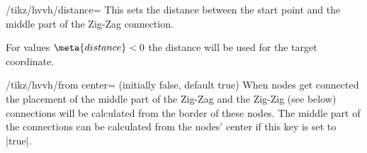 \begin{key}{/tikz/hvvh/distance=}
  This sets the distance between the start point
  and the middle part of the Zig-Zag connection.
  
  For values $\meta{distance} < 0$ the distance will be used for the target coordinate.
\begin{codeexample}[width=8cm,preamble=\usetikzlibrary{paths.ortho}]
\end{codeexample}
\end{key}
\begin{key}{/tikz/hvvh/from center= (initially false, default true)}
  When nodes get connected the placement of the middle part of the Zig-Zag
  and the Zig-Zig (see below) connections will be calculated from the border
  of these nodes.
  The middle part of the connections can be calculated from the nodes' center
  if this key is set to |true|.
\end{key}

